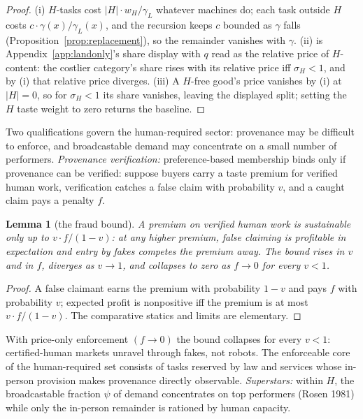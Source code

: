 \documentclass[12pt]{article}
\theoremstyle{plain}
\newtheorem{lemma}[proposition]{Lemma}
\begin{document}
\begin{proof}
(i) $H$-tasks cost $|H|\cdot w_H/\gamma _L$ whatever machines do; each task outside $H$ costs $c\cdot \gamma (x)/\gamma _L(x)$, and the recursion keeps $c$ bounded as $\gamma$ falls (Proposition~\ref{prop:replacement}), so the remainder vanishes with $\gamma$. (ii) is Appendix~\ref{app:landonly}'s share display with $q$ read as the relative price of $H$-content: the costlier category's share rises with its relative price iff $\sigma _H < 1$, and by (i) that relative price diverges. (iii) A $H$-free good's price vanishes by (i) at $|H| = 0$, so for $\sigma _H < 1$ its share vanishes, leaving the displayed split; setting the $H$ taste weight to zero returns the baseline.
\end{proof}

Two qualifications govern the human-required sector: provenance may be difficult to enforce, and broadcastable demand may concentrate on a small number of performers. \emph{Provenance verification:} preference-based membership binds only if provenance can be verified: suppose buyers carry a taste premium for verified human work, verification catches a false claim with probability $v$, and a caught claim pays a penalty $f$.

\begin{lemma}[the fraud bound]\label{lem:fraud}
A premium on verified human work is sustainable only up to $v\cdot f/(1-v)$: at any higher premium, false claiming is profitable in expectation and entry by fakes competes the premium away. The bound rises in $v$ and in $f$, diverges as $v \to 1$, and collapses to zero as $f \to 0$ for every $v < 1$.
\end{lemma}

\begin{proof}
A false claimant earns the premium with probability $1 - v$ and pays $f$ with probability $v$; expected profit is nonpositive iff the premium is at most $v\cdot f/(1-v)$. The comparative statics and limits are elementary.
\end{proof}

With price-only enforcement $(f \to 0)$ the bound collapses for every $v < 1$: certified-human markets unravel through fakes, not robots. The enforceable core of the human-required set consists of tasks reserved by law and services whose in-person provision makes provenance directly observable. \emph{Superstars:} within $H$, the broadcastable fraction $\psi$ of demand concentrates on top performers (Rosen 1981) while only the in-person remainder is rationed by human capacity.
\end{document}
